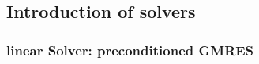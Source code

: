 \subsection{Introduction of solvers}

\subsubsection{linear Solver: preconditioned GMRES}
\label{sec:ptg_gmres}

